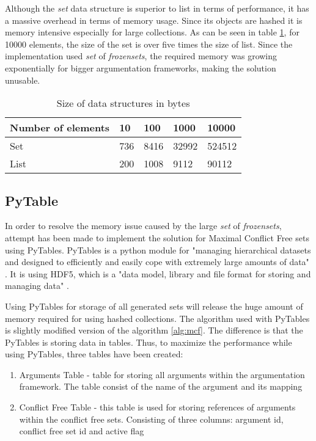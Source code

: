 Although the \textit{set} data structure is superior to list in terms of performance, it has a massive overhead in terms of memory usage. Since its objects are hashed it is memory intensive especially for large collections. As can be seen in table \ref{table:sizeDataStructures}, for 10000 elements, the size of the set is over five times the size of list. Since the implementation used \textit{set} of \textit{frozensets}, the required memory was growing exponentially for bigger argumentation frameworks, making the solution unusable.

\begin{table}[h]	
	\centering
	\caption{Size of data structures in bytes}
	\label{table:sizeDataStructures}
	\begin{tabular}{lllll}
		\hline
		Number of elements & 10  & 100  & 1000  & 10000  \\ \hline
		Set                & 736 & 8416 & 32992 & 524512 \\
		List               & 200 & 1008 & 9112  & 90112 
	\end{tabular}
\end{table}


\subsection{PyTable}
In order to resolve the memory issue caused by the large \textit{set} of \textit{frozensets}, attempt has been made to implement the solution for Maximal Conflict Free sets using PyTables. PyTables is a python module for "managing hierarchical datasets and designed to efficiently and easily cope with extremely large amounts of data" \citep{pytables}. It is using HDF5, which is a "data model, library and file format for storing and managing data" \citep{hdf5}. 

Using PyTables for storage of all generated sets will release the huge amount of memory required for using hashed collections. The algorithm used with PyTables is slightly modified version of the algorithm \ref{alg:mcf}. The difference is that the PyTables is storing data in tables. Thus, to maximize the performance while using PyTables, three tables have been created:
\begin{enumerate}
	\item{Arguments Table - table for storing all arguments within the argumentation framework. The table consist of the name of the argument and its mapping}
	\item{Conflict Free Table - this table is used for storing references of arguments within the conflict free sets. Consisting of three columns: argument id, conflict free set id and active flag}
\end{enumerate}

